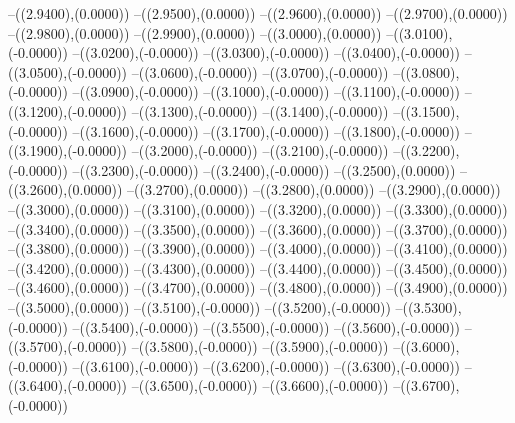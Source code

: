 {	--({\sx*(2.9400)},{\sy*(0.0000)})
	--({\sx*(2.9500)},{\sy*(0.0000)})
	--({\sx*(2.9600)},{\sy*(0.0000)})
	--({\sx*(2.9700)},{\sy*(0.0000)})
	--({\sx*(2.9800)},{\sy*(0.0000)})
	--({\sx*(2.9900)},{\sy*(0.0000)})
	--({\sx*(3.0000)},{\sy*(0.0000)})
	--({\sx*(3.0100)},{\sy*(-0.0000)})
	--({\sx*(3.0200)},{\sy*(-0.0000)})
	--({\sx*(3.0300)},{\sy*(-0.0000)})
	--({\sx*(3.0400)},{\sy*(-0.0000)})
	--({\sx*(3.0500)},{\sy*(-0.0000)})
	--({\sx*(3.0600)},{\sy*(-0.0000)})
	--({\sx*(3.0700)},{\sy*(-0.0000)})
	--({\sx*(3.0800)},{\sy*(-0.0000)})
	--({\sx*(3.0900)},{\sy*(-0.0000)})
	--({\sx*(3.1000)},{\sy*(-0.0000)})
	--({\sx*(3.1100)},{\sy*(-0.0000)})
	--({\sx*(3.1200)},{\sy*(-0.0000)})
	--({\sx*(3.1300)},{\sy*(-0.0000)})
	--({\sx*(3.1400)},{\sy*(-0.0000)})
	--({\sx*(3.1500)},{\sy*(-0.0000)})
	--({\sx*(3.1600)},{\sy*(-0.0000)})
	--({\sx*(3.1700)},{\sy*(-0.0000)})
	--({\sx*(3.1800)},{\sy*(-0.0000)})
	--({\sx*(3.1900)},{\sy*(-0.0000)})
	--({\sx*(3.2000)},{\sy*(-0.0000)})
	--({\sx*(3.2100)},{\sy*(-0.0000)})
	--({\sx*(3.2200)},{\sy*(-0.0000)})
	--({\sx*(3.2300)},{\sy*(-0.0000)})
	--({\sx*(3.2400)},{\sy*(-0.0000)})
	--({\sx*(3.2500)},{\sy*(0.0000)})
	--({\sx*(3.2600)},{\sy*(0.0000)})
	--({\sx*(3.2700)},{\sy*(0.0000)})
	--({\sx*(3.2800)},{\sy*(0.0000)})
	--({\sx*(3.2900)},{\sy*(0.0000)})
	--({\sx*(3.3000)},{\sy*(0.0000)})
	--({\sx*(3.3100)},{\sy*(0.0000)})
	--({\sx*(3.3200)},{\sy*(0.0000)})
	--({\sx*(3.3300)},{\sy*(0.0000)})
	--({\sx*(3.3400)},{\sy*(0.0000)})
	--({\sx*(3.3500)},{\sy*(0.0000)})
	--({\sx*(3.3600)},{\sy*(0.0000)})
	--({\sx*(3.3700)},{\sy*(0.0000)})
	--({\sx*(3.3800)},{\sy*(0.0000)})
	--({\sx*(3.3900)},{\sy*(0.0000)})
	--({\sx*(3.4000)},{\sy*(0.0000)})
	--({\sx*(3.4100)},{\sy*(0.0000)})
	--({\sx*(3.4200)},{\sy*(0.0000)})
	--({\sx*(3.4300)},{\sy*(0.0000)})
	--({\sx*(3.4400)},{\sy*(0.0000)})
	--({\sx*(3.4500)},{\sy*(0.0000)})
	--({\sx*(3.4600)},{\sy*(0.0000)})
	--({\sx*(3.4700)},{\sy*(0.0000)})
	--({\sx*(3.4800)},{\sy*(0.0000)})
	--({\sx*(3.4900)},{\sy*(0.0000)})
	--({\sx*(3.5000)},{\sy*(0.0000)})
	--({\sx*(3.5100)},{\sy*(-0.0000)})
	--({\sx*(3.5200)},{\sy*(-0.0000)})
	--({\sx*(3.5300)},{\sy*(-0.0000)})
	--({\sx*(3.5400)},{\sy*(-0.0000)})
	--({\sx*(3.5500)},{\sy*(-0.0000)})
	--({\sx*(3.5600)},{\sy*(-0.0000)})
	--({\sx*(3.5700)},{\sy*(-0.0000)})
	--({\sx*(3.5800)},{\sy*(-0.0000)})
	--({\sx*(3.5900)},{\sy*(-0.0000)})
	--({\sx*(3.6000)},{\sy*(-0.0000)})
	--({\sx*(3.6100)},{\sy*(-0.0000)})
	--({\sx*(3.6200)},{\sy*(-0.0000)})
	--({\sx*(3.6300)},{\sy*(-0.0000)})
	--({\sx*(3.6400)},{\sy*(-0.0000)})
	--({\sx*(3.6500)},{\sy*(-0.0000)})
	--({\sx*(3.6600)},{\sy*(-0.0000)})
	--({\sx*(3.6700)},{\sy*(-0.0000)})
}
